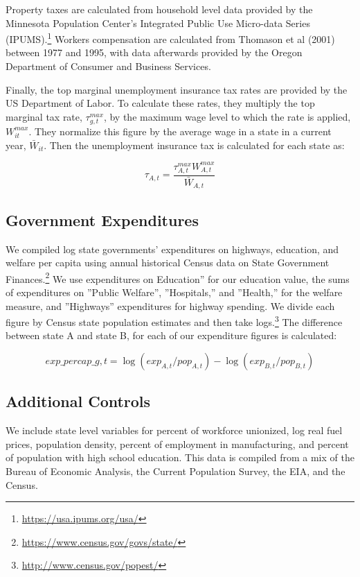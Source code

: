 \documentclass[12pt,a4paper]{article}
\begin{document}
Property taxes are calculated from household level data provided by the Minnesota Population Center’s Integrated Public Use Micro-data Series (IPUMS).\footnote{\url{https://usa.ipums.org/usa/}} Workers compensation are calculated from Thomason et al (2001) between 1977 and 1995, with data afterwards provided by the Oregon Department of Consumer and Business Services. 

Finally, the top marginal unemployment insurance tax rates are provided by the US Department of Labor. To calculate these rates, they multiply the top marginal tax rate, $\tau_{g,t}^{max}$, by the maximum wage level to which the rate is applied, $W_{it}^{max}$. They normalize this figure by the average wage in a state in a current year, $\bar W_{it}$. Then the unemployment insurance tax is calculated for each state as: 

\begin{equation} \tau_{A,t} = \frac{\tau_{A,t}^{max}W_{A,t}^{max}}{\bar W_{A,t}}\end{equation}

\subsection{Government Expenditures}

We compiled log state governments’ expenditures on highways, education, and welfare per capita using annual historical Census data on State Government Finances.\footnote{\url{https://www.census.gov/govs/state/}} We use expenditures on Education” for our education value, the sums of expenditures on ”Public Welfare”, ”Hospitals,” and ”Health,” for the welfare measure, and ”Highways” expenditures for highway spending.  We divide each figure by Census state population estimates and then take logs.\footnote{\url{http://www.census.gov/popest/}} The difference between state A and state B, for each of our expenditure figures is calculated:

\begin{equation} exp\_percap\_{g,t} = \log(exp_{A,t}/pop_{A,t}) - \log(exp_{B,t}/pop_{B,t}) \end{equation}

\subsection{Additional Controls}

We include state level variables for percent of workforce unionized, log real fuel prices, population density, percent of employment in manufacturing, and percent of population with high school education. This data is compiled from a mix of the Bureau of Economic Analysis, the Current Population Survey, the EIA, and the Census.
\end{document}
